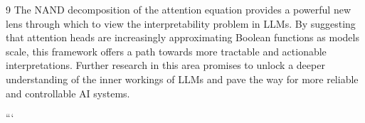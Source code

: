 \documentclass[11pt]{article}
\theoremstyle{definition}
\begin{document}
\begin{thebibliography}{9}
The NAND decomposition of the attention equation provides a powerful new lens through which to view the interpretability problem in LLMs. By suggesting that attention heads are increasingly approximating Boolean functions as models scale, this framework offers a path towards more tractable and actionable interpretations. Further research in this area promises to unlock a deeper understanding of the inner workings of LLMs and pave the way for more reliable and controllable AI systems.












































































```














\end{thebibliography}
\end{document}
